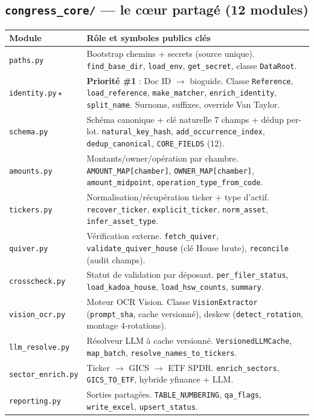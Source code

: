 \documentclass[11pt,a4paper]{article}
\begin{document}
\subsection{\texttt{congress\_core/} --- le cœur partagé (12 modules)}
\begin{center}\small
\begin{longtable}{@{}p{2.6cm}p{12.2cm}@{}}
\toprule
\textbf{Module} & \textbf{Rôle et symboles publics clés} \\
\midrule
\texttt{paths.py} & Bootstrap chemins + secrets (source unique). \texttt{find\_base\_dir}, \texttt{load\_env}, \texttt{get\_secret}, classe \texttt{DataRoot}. \\
\texttt{identity.py}\,$\star$ & \textbf{Priorité \#1} : Doc ID $\rightarrow$ bioguide. Classe \texttt{Reference}, \texttt{load\_reference}, \texttt{make\_matcher}, \texttt{enrich\_identity}, \texttt{split\_name}. Surnoms, suffixes, override Van Taylor. \\
\texttt{schema.py} & Schéma canonique + clé naturelle 7 champs + dédup per-lot. \texttt{natural\_key\_hash}, \texttt{add\_occurrence\_index}, \texttt{dedup\_canonical}, \texttt{CORE\_FIELDS} (12). \\
\texttt{amounts.py} & Montants/owner/opération par chambre. \texttt{AMOUNT\_MAP[chamber]}, \texttt{OWNER\_MAP[chamber]}, \texttt{amount\_midpoint}, \texttt{operation\_type\_from\_code}. \\
\texttt{tickers.py} & Normalisation/récupération ticker + type d'actif. \texttt{recover\_ticker}, \texttt{explicit\_ticker}, \texttt{norm\_asset}, \texttt{infer\_asset\_type}. \\
\texttt{quiver.py} & Vérification externe. \texttt{fetch\_quiver}, \texttt{validate\_quiver\_house} (clé House brute), \texttt{reconcile} (audit champs). \\
\texttt{crosscheck.py} & Statut de validation par déposant. \texttt{per\_filer\_status}, \texttt{load\_kadoa\_house}, \texttt{load\_hsw\_counts}, \texttt{summary}. \\
\texttt{vision\_ocr.py} & Moteur OCR Vision. Classe \texttt{VisionExtractor} (\texttt{prompt\_sha}, cache versionné), deskew (\texttt{detect\_rotation}, montage 4-rotations). \\
\texttt{llm\_resolve.py} & Résolveur LLM à cache versionné. \texttt{VersionedLLMCache}, \texttt{map\_batch}, \texttt{resolve\_names\_to\_tickers}. \\
\texttt{sector\_enrich.py} & Ticker $\rightarrow$ GICS $\rightarrow$ ETF SPDR. \texttt{enrich\_sectors}, \texttt{GICS\_TO\_ETF}, hybride yfinance + LLM. \\
\texttt{reporting.py} & Sorties partagées. \texttt{TABLE\_NUMBERING}, \texttt{qa\_flags}, \texttt{write\_excel}, \texttt{upsert\_status}. \\
\bottomrule
\end{longtable}
\end{center}
\end{document}
